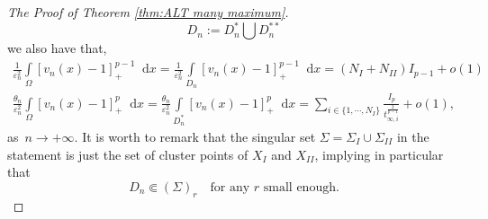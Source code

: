 \documentclass[10pt]{amsart}
\newcommand{\dd}{\mathop{}\!\mathrm{d}}
\newcommand{\eps}{\varepsilon}
\renewcommand{\to}{\rightarrow}
\newcommand{\ii}{\infty}
\newcommand{\om}{\Omega}
\begin{document}
\begin{proof}[The Proof of Theorem \ref{thm:ALT many maximum}]
     $$
     D_n:=D^*_n\bigcup D^{**}_n
     $$
     we also have that,
           \begin{align*}
              \frac{1}{\eps_n^2}\int\limits_{\om} [v_n(x)-1]_+^{p-1}\dd{x}=\frac{1}{\eps_n^2}\int\limits_{D_n} [v_n(x)-1]_+^{p-1}\dd{x}=
              (N_I+N_{II})I_{p-1} + o(1)
            \end{align*}
            \begin{align*}
              \frac{\theta_n}{\eps_n^2}\int\limits_{\om} [v_n(x)-1]_+^{p}\dd{x}=
              \frac{\theta_n}{\eps_n^2}\int\limits_{D^*_n} [v_n(x)-1]_+^{p}\dd{x}=
              \sum\limits_{i\in \{1,\cdots,N_I\}}\frac{I_p}{t_{\ii,i}^{\frac{2}{p-1}}} + o(1),
            \end{align*}
            as~$n\to+\infty$. It is worth to remark that the singular set $\Sigma=\Sigma_I\cup \Sigma_{II}$ in the statement is just the set of cluster points
            of $X_I$ and $X_{II}$, implying in particular that
            $$
            D_n\Subset (\Sigma)_r\quad \mbox{for any $r$ small enough}.
            $$


\end{proof}
\end{document}
